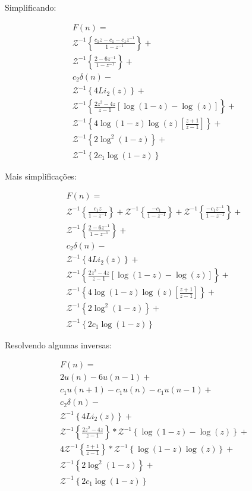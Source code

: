 \documentclass[a4paper,10pt]{article}
\begin{document}
Simplificando:

$$
\begin{array}{lcl} 
 F(n) = \\
 \mathcal{Z}^{-1}\left\{\displaystyle \frac{c_1z - c_1 - c_1z^{-1}}{1-z^{-1}}\right\} + \\
 \mathcal{Z}^{-1}\left\{\displaystyle \frac{2  - 6z ^{-1}}{1-z^{-1}}\right\}+\\
 c_2 \delta(n)-\\
 \mathcal{Z}^{-1}\left\{4 Li_2(z)\right\}+\\
 \mathcal{Z}^{-1}\left\{\displaystyle \frac{2 z^2 - 4z}{z-1}\displaystyle \left[\log(1-z) - \log(z)\right]\right\} +\\
 \mathcal{Z}^{-1}\left\{4 \log(1-z)\log(z) \left[\displaystyle \frac{ z  + 1}{z-1}\right]\right\}+\\
 \mathcal{Z}^{-1}\left\{2 \log^2(1-z)\right\} + \\
 \mathcal{Z}^{-1}\left\{2 c_1  \log(1-z)\right\} 
\end{array} 
$$

Mais simplificações:


$$
\begin{array}{lcl} 
 F(n) = \\
 \mathcal{Z}^{-1}\left\{\displaystyle \frac{c_1z }{1-z^{-1}}\right\} +
 \mathcal{Z}^{-1}\left\{\displaystyle \frac{- c_1}{1-z^{-1}}\right\} + 
 \mathcal{Z}^{-1}\left\{\displaystyle \frac{- c_1z^{-1}}{1-z^{-1}}\right\} + \\
 \mathcal{Z}^{-1}\left\{\displaystyle \frac{2  - 6z ^{-1}}{1-z^{-1}}\right\}+\\
 c_2 \delta(n)-\\
 \mathcal{Z}^{-1}\left\{4 Li_2(z)\right\}+\\
 \mathcal{Z}^{-1}\left\{\displaystyle \frac{2 z^2 - 4z}{z-1}\displaystyle \left[\log(1-z) - \log(z)\right]\right\} +\\
 \mathcal{Z}^{-1}\left\{4 \log(1-z)\log(z) \left[\displaystyle \frac{ z  + 1}{z-1}\right]\right\}+\\
 \mathcal{Z}^{-1}\left\{2 \log^2(1-z)\right\} + \\
 \mathcal{Z}^{-1}\left\{2 c_1  \log(1-z)\right\} 
\end{array} 
$$

Resolvendo algumas inversas:

$$
\begin{array}{lcl} 
 F(n) = \\
 2 u(n) -6 u(n-1) +\\
 c_1 u(n + 1) -c_1 u(n) - c_1 u(n-1) + \\
 c_2 \delta(n)- \\
 \mathcal{Z}^{-1}\left\{4 Li_2(z)\right\}+\\
 \mathcal{Z}^{-1}\left\{\displaystyle \frac{2 z^2 - 4z}{z-1}\right\} *
 \mathcal{Z}^{-1}\left\{\displaystyle \log(1-z) - \log(z)\right\} +\\
 4\mathcal{Z}^{-1}\left\{\displaystyle \frac{ z  + 1}{z-1}\right\}*
 \mathcal{Z}^{-1}\left\{ \log(1-z)\log(z) \right\}+\\
 \mathcal{Z}^{-1}\left\{2 \log^2(1-z)\right\} + \\
 \mathcal{Z}^{-1}\left\{2 c_1  \log(1-z)\right\} 
\end{array} 
$$
\end{document}
